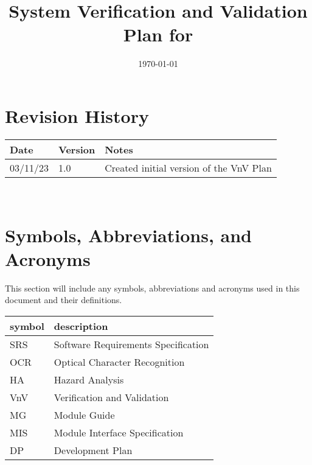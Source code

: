 \documentclass[12pt, titlepage]{article}
\begin{document}
\title{System Verification and Validation Plan for \progname{}} 
\author{\authname}
\date{\today}
	
\maketitle


\section*{Revision History}

\begin{tabularx}{\textwidth}{p{3cm}p{2cm}X}
\toprule {\bf Date} & {\bf Version} & {\bf Notes}\\
\midrule
03/11/23 & 1.0 & Created initial version of the VnV Plan\\
\bottomrule
\end{tabularx}

~\\

\newpage

\tableofcontents

\listoftables

\newpage

\section{Symbols, Abbreviations, and Acronyms}

This section will include any symbols, abbreviations and acronyms
used in this document and their definitions. \\

\renewcommand{\arraystretch}{1.2}
\begin{tabular}{l l} 
  \toprule		
  \textbf{symbol} & \textbf{description}\\
  \midrule 
  SRS & Software Requirements Specification\\
  OCR & Optical Character Recognition\\
  HA & Hazard Analysis\\
  VnV & Verification and Validation\\
  MG & Module Guide\\
  MIS & Module Interface Specification\\
  DP & Development Plan\\
  \bottomrule
\end{tabular}\\
\end{document}
